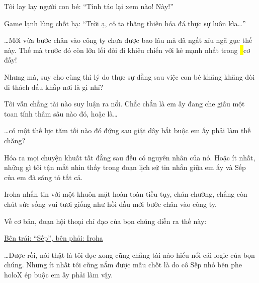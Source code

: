 \documentclass[../main.tex]{subfiles}
\begin{document}
Tôi lay lay người con bé: ``Tỉnh táo lại xem nào! Này!''

Game lạnh lùng chốt hạ: ``Trời ạ, cô ta thăng thiên hóa đá thực sự luôn kìa\dots''

\dots Mới vừa bước chân vào công ty chưa được bao lâu mà đã ngất xỉu ngã gục thế này. Thế mà trước đó còn lớn lối đòi đi khiêu chiến với kẻ mạnh nhất trong \hl\ cơ đấy!

Nhưng mà, suy cho cùng thì lý do thực sự đằng sau việc con bé khăng khăng đòi đi thách đấu khắp nơi là gì nhỉ?

Tôi vẫn chẳng tài nào suy luận ra nổi. Chắc chắn là em ấy đang che giấu một toan tính thâm sâu nào đó, hoặc là\dots

\dots có một thế lực tăm tối nào đó đứng sau giật dây bắt buộc em ấy phải làm thế chăng?

\omk

Hóa ra mọi chuyện khuất tất đằng sau đều có nguyên nhân của nó. Hoặc ít nhất, những gì tôi tận mắt nhìn thấy trong đoạn lịch sử tin nhắn giữa em ấy và Sếp của em đã sáng tỏ tất cả.

Iroha nhắn tin với một khuôn mặt hoàn toàn tiều tụy, chán chường, chẳng còn chút sức sống vui tươi giống như hồi đầu mới bước chân vào công ty.


Về cơ bản, đoạn hội thoại chỉ đạo của bọn chúng diễn ra thế này:

\begin{center}
    \uline{Bên trái: ``Sếp'', bên phải: Iroha}
\end{center}








\dots Được rồi, nói thật là tôi đọc xong cũng chẳng tài nào hiểu nổi cái logic của bọn chúng. Nhưng ít nhất tôi cũng nắm được mấu chốt là do cô Sếp nhỏ bên phe holoX ép buộc em ấy phải làm vậy.
\end{document}
